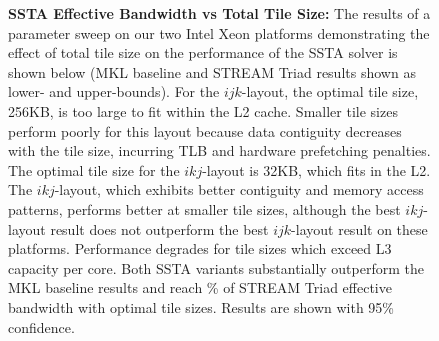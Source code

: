 \documentclass{sig-alternate}
\newcommand{\textapprox}{\texttildelow}
\begin{document}
\begin{figure}[!bth]
  \centering
  \caption{
    \textbf{SSTA Effective Bandwidth vs Total Tile Size:}
    The results of a parameter sweep on our two Intel Xeon platforms
      demonstrating the effect of total tile size on the performance of the
      SSTA solver is shown below (MKL baseline and STREAM Triad results shown as
      lower- and upper-bounds).
    For the \(ijk\)-layout, the optimal tile size, 256KB, is too large to fit
      within the L2 cache.
    Smaller tile sizes perform poorly for this layout because data contiguity
      decreases with the tile size, incurring TLB and hardware prefetching
      penalties.
    The optimal tile size for the \(ikj\)-layout is 32KB, which fits in the L2. 
    The \(ikj\)-layout, which exhibits better contiguity and memory access
      patterns, performs better at smaller tile sizes, although the best
      \(ikj\)-layout result does not outperform the best \(ijk\)-layout result
      on these platforms.
    Performance degrades for tile sizes which exceed L3 capacity per core.
    Both SSTA variants substantially outperform the MKL baseline results and 
      reach \textapprox 90\% of STREAM Triad effective bandwidth with optimal 
      tile sizes.
    Results are shown with 95\% confidence.
  }
  \label{fig:results:bw_vs_tile_size_xeon}
  \begin{minipage}{0.49\textwidth}
  \end{minipage}
  \begin{minipage}{0.49\textwidth}
  \end{minipage}
\end{figure}
\end{document}
